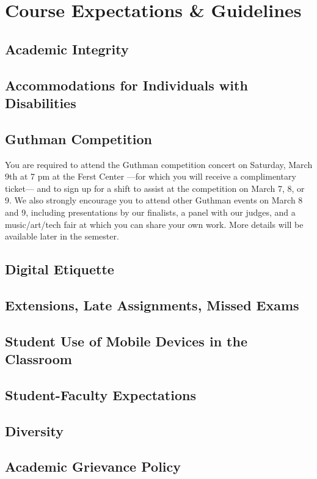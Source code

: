 \documentclass[letterpaper,oneside,10pt]{scrartcl}
\begin{document}

    
\section{Course Expectations \& Guidelines}
    
    \subsection{Academic Integrity}
        

    \subsection{Accommodations for Individuals with Disabilities}
        
        

    \subsection{Guthman Competition}
        You are required to attend the Guthman competition concert on Saturday, March 9th at 7 pm at the Ferst Center ---for which you will receive a complimentary ticket--- and to sign up for a shift to assist at the competition on March 7, 8, or 9. We also strongly encourage you to attend other Guthman events on March 8 and 9, including presentations by our finalists, a panel with our judges, and a music/art/tech fair at which you can share your own work. More details will be available later in the semester.
        
    \subsection{Digital Etiquette}
        
        
    \subsection{Extensions, Late Assignments, Missed Exams}
        

    \subsection{Student Use of Mobile Devices in the Classroom}
        
        
    \subsection{Student-Faculty Expectations}
        
        
    \subsection{Diversity}
        
        
    \subsection{Academic Grievance Policy}
        
\end{document}
